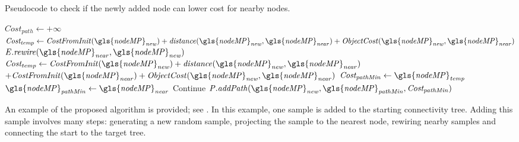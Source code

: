 \begin{algorithm}[H]
\caption{Pseudocode to check if the newly added node can lower cost for nearby nodes.}%
\label{pseudocode:proposed_rrt_star_three}
\begin{algorithmic}[1]
\hspace{-0.9cm}\colorbox{my_green}{\parbox{\linewidth}{%
    \State $\mathit{Cost_{path}} \leftarrow +\infty$ 
    \State $\mathit{Cost_{temp}} \leftarrow \mathit{CostFromInit(\gls{nodeMP}_{new}) + distance(\gls{nodeMP}_{new}, \gls{nodeMP}_{near}) + ObjectCost(\gls{nodeMP}_{new}, \gls{nodeMP}_{near})}$
    \State $\mathit{E.rewire(\gls{nodeMP}_{near}, \gls{nodeMP}_{new})}$
           \EndIf
        \EndIf
      \Else {}
      \State $\mathit{Cost_{temp} \leftarrow CostFromInit(\gls{nodeMP}_{new}) + distance(\gls{nodeMP}_{new}, \gls{nodeMP}_{near})} $ \newline\hspace*{10em} $+ \mathit{CostFromInit(\gls{nodeMP}_{near}) + ObjectCost(\gls{nodeMP}_{new}, \gls{nodeMP}_{near})}$
          \State $\mathit{Cost_{pathMin} \leftarrow \gls{nodeMP}_{temp}}$
          \State $\mathit{\gls{nodeMP}_{pathMin} \leftarrow \gls{nodeMP}_{near}}$
              \EndIf
          \EndIf
      \EndIf
          \State Continue
      \Else
      \State $\mathit{P.addPath(\gls{nodeMP}_{new}, \gls{nodeMP}_{pathMin}, Cost_{pathMin})}$
      \EndIf
    \EndFor
}}
\end{algorithmic}
\end{algorithm}

An example of the proposed algorithm is provided; see . In this example, one sample is added to the starting connectivity tree. Adding this sample involves many steps: generating a new random sample, projecting the sample to the nearest node, rewiring nearby samples and connecting the start to the target tree.\bs

